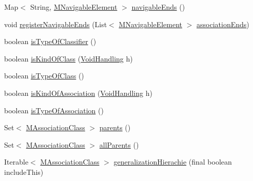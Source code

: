 \begin{DoxyCompactItemize}
\item 
Map$<$ String, \hyperlink{interfaceorg_1_1tzi_1_1use_1_1uml_1_1mm_1_1_m_navigable_element}{M\-Navigable\-Element} $>$ \hyperlink{classorg_1_1tzi_1_1use_1_1uml_1_1mm_1_1_m_association_class_impl_aff99489695a75ab4a63458aa776eeb39}{navigable\-Ends} ()
\item 
void \hyperlink{classorg_1_1tzi_1_1use_1_1uml_1_1mm_1_1_m_association_class_impl_a0167d0d72d55bba66573bb76780a6adb}{register\-Navigable\-Ends} (List$<$ \hyperlink{interfaceorg_1_1tzi_1_1use_1_1uml_1_1mm_1_1_m_navigable_element}{M\-Navigable\-Element} $>$ \hyperlink{classorg_1_1tzi_1_1use_1_1uml_1_1mm_1_1_m_association_class_impl_a5b684f0b90adc7a971c9f5d2d0c99288}{association\-Ends})
\item 
boolean \hyperlink{classorg_1_1tzi_1_1use_1_1uml_1_1mm_1_1_m_association_class_impl_a1496ae22f5e241e7d11a2d2bdb2ac657}{is\-Type\-Of\-Classifier} ()
\item 
boolean \hyperlink{classorg_1_1tzi_1_1use_1_1uml_1_1mm_1_1_m_association_class_impl_af93d5bc536aedd85df4258cf14fb3451}{is\-Kind\-Of\-Class} (\hyperlink{enumorg_1_1tzi_1_1use_1_1uml_1_1ocl_1_1type_1_1_type_1_1_void_handling}{Void\-Handling} h)
\item 
boolean \hyperlink{classorg_1_1tzi_1_1use_1_1uml_1_1mm_1_1_m_association_class_impl_ab480d286c1f88b477cc9b36c5120b01f}{is\-Type\-Of\-Class} ()
\item 
boolean \hyperlink{classorg_1_1tzi_1_1use_1_1uml_1_1mm_1_1_m_association_class_impl_a46d702f3710d135e5414dfea890171de}{is\-Kind\-Of\-Association} (\hyperlink{enumorg_1_1tzi_1_1use_1_1uml_1_1ocl_1_1type_1_1_type_1_1_void_handling}{Void\-Handling} h)
\item 
boolean \hyperlink{classorg_1_1tzi_1_1use_1_1uml_1_1mm_1_1_m_association_class_impl_aa1bfaa0596fe63be4645ad957537efc4}{is\-Type\-Of\-Association} ()
\item 
Set$<$ \hyperlink{interfaceorg_1_1tzi_1_1use_1_1uml_1_1mm_1_1_m_association_class}{M\-Association\-Class} $>$ \hyperlink{classorg_1_1tzi_1_1use_1_1uml_1_1mm_1_1_m_association_class_impl_a0c1b602c3934ca41865979f32e583aac}{parents} ()
\item 
Set$<$ \hyperlink{interfaceorg_1_1tzi_1_1use_1_1uml_1_1mm_1_1_m_association_class}{M\-Association\-Class} $>$ \hyperlink{classorg_1_1tzi_1_1use_1_1uml_1_1mm_1_1_m_association_class_impl_a4d21db99a396695c41ba6ef56b0ecac3}{all\-Parents} ()
\item 
Iterable$<$ \hyperlink{interfaceorg_1_1tzi_1_1use_1_1uml_1_1mm_1_1_m_association_class}{M\-Association\-Class} $>$ \hyperlink{classorg_1_1tzi_1_1use_1_1uml_1_1mm_1_1_m_association_class_impl_a0b79eceb8b2b0b24befd05227b2b998a}{generalization\-Hierachie} (final boolean include\-This)

\end{DoxyCompactItemize}
